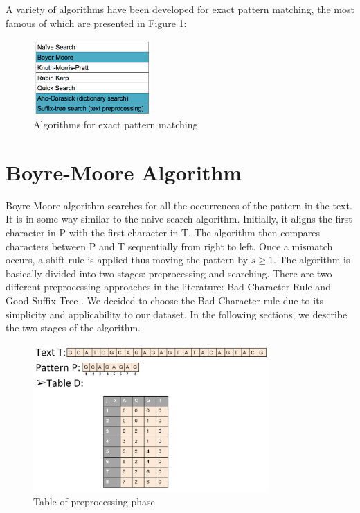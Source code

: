 \documentclass[paper=a4, fontsize=11pt]{scrartcl} %
\numberwithin{equation}{section} %
\numberwithin{figure}{section} %
\numberwithin{table}{section} %
\begin{document}
A variety of algorithms have been developed for exact pattern matching, the most famous of which are presented in Figure \ref{algorithms}:

\begin{figure}[h!]
\centering
\includegraphics[width=0.4\textwidth]{figures/algorithms.png}
\caption{Algorithms for exact pattern matching}
\label{algorithms}
\end{figure}

\newpage

\section{Boyre-Moore Algorithm}
Boyre Moore algorithm \cite{bm_fast} searches for all the occurrences of the pattern in the text. It is in some way similar to the naive search algorithm. Initially, it aligns the first character in P with the first character in T. The algorithm then compares characters between P and T sequentially from right to left. Once a mismatch occurs, a shift rule is applied thus moving the pattern by $s\ge 1$. The algorithm is basically divided into two stages: preprocessing and searching. There are two different preprocessing approaches in the literature: Bad Character Rule and Good Suffix Tree \cite{bm_tbc}. We decided to choose the Bad Character rule due to its simplicity and applicability to our dataset. In the following sections, we describe the two stages of the algorithm.


\begin{figure}[h!]
\centering
\includegraphics[width=0.8\textwidth]{figures/Example_Table.png}
\caption{Table of preprocessing phase}
\label{fig:table}
\end{figure}
\end{document}
